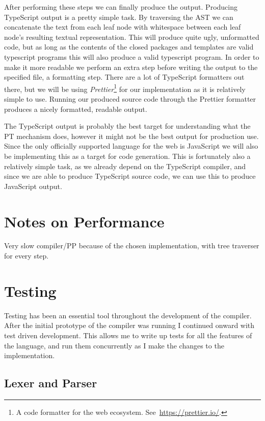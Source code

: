 After performing these steps we can finally produce the output.
Producing TypeScript output is a pretty simple task.
By traversing the AST we can concatenate the text from each leaf node with whitespace between each leaf node's resulting textual representation.
This will produce quite ugly, unformatted code, but as long as the contents of the closed packages and templates are valid typescript programs this will also produce a valid typescript program.
In order to make it more readable we perform an extra step before writing the output to the specified file, a formatting step.
There are a lot of TypeScript formatters out there, but we will be using \textit{Prettier}\footnote{A code formatter for the web ecosystem. See~\url{https://prettier.io/}.} for our implementation as it is relatively simple to use.
Running our produced source code through the Prettier formatter produces a nicely formatted, readable output.

The TypeScript output is probably the best target for understanding what the PT mechanism does, however it might not be the best output for production use.
Since the only officially supported language for the web is JavaScript we will also be implementing this as a target for code generation.
This is fortunately also a relatively simple task, as we already depend on the TypeScript compiler, and since we are able to produce TypeScript source code, we can use this to produce JavaScript output.

\section{Notes on Performance}\label{sec:notes-on-performance}

Very slow compiler/PP because of the chosen implementation, with tree traverser for every step.


\section{Testing}\label{sec:testing}

Testing has been an essential tool throughout the development of the compiler.
After the initial prototype of the compiler was running I continued onward with test driven development.
This allows me to write up tests for all the features of the language, and run them concurrently as I make the changes to the implementation.

\subsection{Lexer and Parser}\label{subsec:testing-lexer-and-parser}

